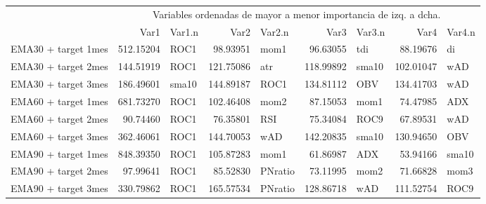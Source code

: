 \documentclass[]{article}
\newenvironment{Shaded}{\begin{snugshade}}{\end{snugshade}}
\newcommand{\CommentTok}[1]{\textcolor[rgb]{0.56,0.35,0.01}{\textit{#1}}}
\begin{document}
\begin{table}[H]
\centering\begingroup\fontsize{10}{12}\selectfont

\begin{tabular}{l|r|l|r|l|r|l|r|l}
\hline
\multicolumn{1}{c|}{ } & \multicolumn{8}{|c}{Variables ordenadas de mayor a menor importancia de izq. a dcha.} \\
\cline{2-9}
  & Var1 & Var1.n & Var2 & Var2.n & Var3 & Var3.n & Var4 & Var4.n\\
\hline
EMA30 + target 1mes & 512.15204 & ROC1 & 98.93951 & mom1 & 96.63055 & tdi & 88.19676 & di\\
\hline
EMA30 + target 2mes & 144.51919 & ROC1 & 121.75086 & atr & 118.99892 & sma10 & 102.01047 & wAD\\
\hline
EMA30 + target 3mes & 186.49601 & sma10 & 144.89187 & ROC1 & 134.81112 & OBV & 134.41703 & wAD\\
\hline
EMA60 + target 1mes & 681.73270 & ROC1 & 102.46408 & mom2 & 87.15053 & mom1 & 74.47985 & ADX\\
\hline
EMA60 + target 2mes & 90.74460 & ROC1 & 76.35801 & RSI & 75.34084 & ROC9 & 67.89531 & wAD\\
\hline
EMA60 + target 3mes & 362.46061 & ROC1 & 144.70053 & wAD & 142.20835 & sma10 & 130.94650 & OBV\\
\hline
EMA90 + target 1mes & 848.39350 & ROC1 & 105.87283 & mom1 & 61.86987 & ADX & 53.94166 & sma10\\
\hline
EMA90 + target 2mes & 97.99641 & ROC1 & 85.52830 & PNratio & 73.11995 & mom2 & 71.66828 & mom3\\
\hline
EMA90 + target 3mes & 330.79862 & ROC1 & 165.57534 & PNratio & 128.86718 & wAD & 111.52754 & ROC9\\
\hline
\end{tabular}\endgroup{}
\end{table}

\begin{Shaded}
\end{Shaded}
\end{document}
